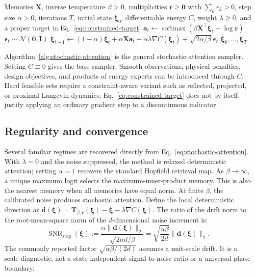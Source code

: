 \begin{algorithm}[H]
\caption{Stochastic Attention Sampler (ULA)}
\label{alg:stochastic-attention}
\begin{algorithmic}[1]
\REQUIRE Memories $\mathbf X$, inverse temperature $\beta>0$, multiplicities
$\mathbf r\geq\mathbf0$ with $\sum_k r_k>0$, step size $\alpha>0$, iterations
$T$, initial state $\boldsymbol\xi_0$, differentiable energy $C$, weight
$\lambda\geq0$, and a proper target in Eq.~\eqref{eq:constrained-target}
\STATE $\mathbf a_t\leftarrow
\operatorname{softmax}(\beta\mathbf X^\top\boldsymbol\xi_t+\log\mathbf r)$
\STATE $\boldsymbol\epsilon_t\sim\mathcal N(\mathbf0,\mathbf I)$
\STATE $\boldsymbol\xi_{t+1}\leftarrow
(1-\alpha)\boldsymbol\xi_t+\alpha\mathbf X\mathbf a_t
-\alpha\lambda\nabla C(\boldsymbol\xi_t)
+\sqrt{2\alpha/\beta}\,\boldsymbol\epsilon_t$
\ENDFOR
\RETURN $\boldsymbol\xi_0,\ldots,\boldsymbol\xi_T$
\end{algorithmic}
\end{algorithm}

Algorithm~\ref{alg:stochastic-attention} is the general stochastic-attention
sampler. Setting $C\equiv0$ gives the base sampler. Smooth observations,
physical penalties, design objectives, and products of energy experts can be
introduced through $C$. Hard feasible sets require a
constraint-aware variant such as reflected, projected, or proximal Langevin
dynamics; Eq.~\eqref{eq:constrained-target} does not by itself justify applying
an ordinary gradient step to a discontinuous indicator.

\subsection{Regularity and convergence}

Several familiar regimes are recovered directly from
Eq.~\eqref{eq:stochastic-attention}. With $\lambda=0$ and the noise suppressed,
the method is relaxed deterministic attention; setting $\alpha=1$ recovers the
standard Hopfield retrieval map. As $\beta\rightarrow\infty$, a unique maximum
logit selects the maximum-inner-product memory. This is also the nearest memory
when all memories have equal norm. At finite $\beta$, the calibrated noise
produces stochastic attention. Define the local deterministic direction as
$\mathbf d(\boldsymbol\xi)=\mathbf T_{\beta,\mathbf r}(\boldsymbol\xi)
-\boldsymbol\xi-\lambda\nabla C(\boldsymbol\xi)$. The ratio of the drift norm
to the root-mean-square norm of the $d$-dimensional noise increment is:
\begin{equation}
\operatorname{SNR}_{\mathrm{step}}(\boldsymbol\xi)
:=\frac{\alpha\lVert\mathbf d(\boldsymbol\xi)\rVert_2}
{\sqrt{2\alpha d/\beta}}
=\sqrt{\frac{\alpha\beta}{2d}}
\lVert\mathbf d(\boldsymbol\xi)\rVert_2.
\label{eq:snr}
\end{equation}
The commonly reported factor $\sqrt{\alpha\beta/(2d)}$ assumes a unit-scale
drift. It is a scale diagnostic, not a state-independent signal-to-noise ratio
or a universal phase boundary.


